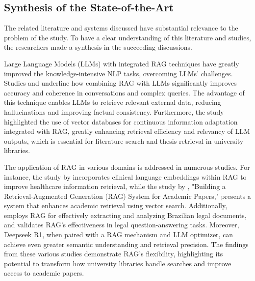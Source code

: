 \begin{refsection}
\section{Synthesis of the State-of-the-Art}

\hspace{1cm}The related literature and systems discussed have substantial relevance to the problem of the study. To have a clear understanding of this literature and studies, the researchers made a synthesis in the succeeding discussions.


\hspace{0.4cm}Large Language Models (LLMs) with integrated RAG techniques have greatly improved the knowledge-intensive NLP tasks, overcoming LLMs' challenges. Studies \cite{thapa2022splitfed} and \cite{thomo2024pubmed} underline how combining RAG with LLMs significantly improves accuracy and coherence in conversations and complex queries. The advantage of this technique enables LLMs to retrieve relevant external data, reducing hallucinations and improving factual consistency. Furthermore, the study \cite{lewis2020retrieval} highlighted the use of vector databases for continuous information adaptation integrated with RAG, greatly enhancing retrieval efficiency and relevancy of LLM outputs, which is essential for literature search and thesis retrieval in university libraries.


\hspace{0.4cm}The application of RAG in various domains is addressed in numerous studies. For instance, the study by \citeauthor{arzideh2024miracle} \citeyear{arzideh2024miracle} incorporates clinical language embeddings within RAG to improve healthcare information retrieval, while the study by \citeauthor{grigoryan2024building} \citeyear{grigoryan2024building}, "Building a Retrieval-Augmented Generation (RAG) System for Academic Papers," presents a system that enhances academic retrieval using vector search. Additionally, \citeauthor{aquino2024extracting} \citeyear{aquino2024extracting} employs RAG for effectively extracting and analyzing Brazilian legal documents, and \citeauthor{ryu2023retrieval} \citeyear{ryu2023retrieval} validates RAG’s effectiveness in legal question-answering tasks. Moreover, Deepseek R1, when paired with a RAG mechanism and LLM optimizer, can achieve even greater semantic understanding and retrieval precision. The findings from these various studies demonstrate RAG's flexibility, highlighting its potential to transform how university libraries handle searches and improve access to academic papers.


\end{refsection}
